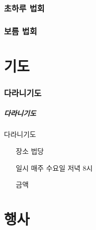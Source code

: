 \documentclass[aspectratio=1610,10pt,xcolor=pdftex,dvipsnames,table,handout]{beamer}
\begin{document}
%
	\section{ 초하루  법회}
	\frame [plain] {\sectionpage}

%
	\section{ 보름  법회}
	\frame [plain] {\sectionpage}


		\part{기도}
		\frame{\partpage}



%
		\section{다라니기도}
		\begin{frame} [t,plain]
		\frametitle{다라니기도}
			\begin{block} {다라니기도 }
			\setlength{\leftmargini}{5em}			
			\begin{itemize}
				\item [장소]	 법당
				\item [일시]	 매주 수요일 저녁 8시
				\item [금액]	
			\end{itemize}
			\end{block}						
		\end{frame}					






		\part{행사}
		\frame{\partpage}
		
\end{document}
